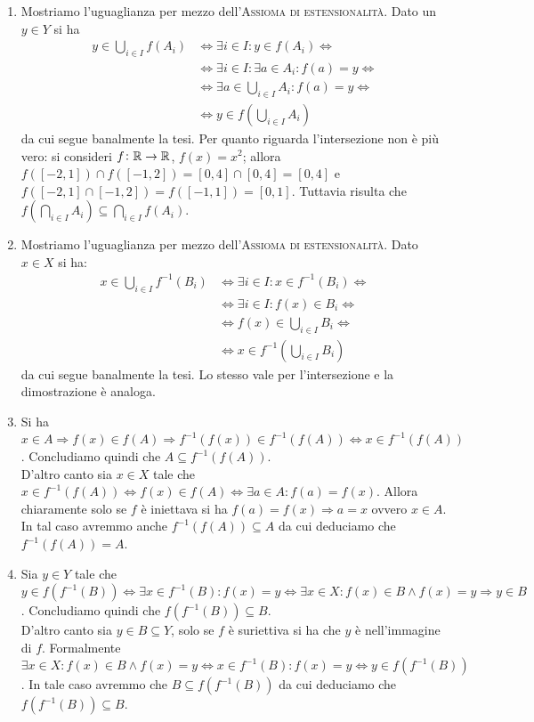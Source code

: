 \documentclass[a4paper]{article}\par \usepackage{style}\par
\begin{document}
\begin{enumerate}
\item Mostriamo l'uguaglianza per mezzo dell'\textsc{Assioma di estensionalità}. Dato un $ y \in Y $ si ha
  \begin{align*}
    y \in \bigcup_{i \in I} f(A_i) & \iff \exists i \in I : y \in f(A_i) \iff \\
                                   & \iff \exists i \in I : \exists a \in A_i : f(a) = y \iff \\
                                   & \iff \exists a \in \bigcup_{i \in I} A_i : f(a) = y \iff \\
                                   & \iff y \in f \left (\bigcup_{i \in I} A_i \right )
  \end{align*}
  da cui segue banalmente la tesi. Per quanto riguarda l'intersezione non è più vero: si consideri $ f \colon \mathbb{R} \to \mathbb{R} $, $ f(x) = x^2 $; allora $ f([-2, 1]) \cap f([-1, 2]) = [0, 4] \cap [0, 4] = [0, 4] $ e $ f([-2, 1] \cap [-1, 2]) = f([-1, 1]) = [0, 1] $. Tuttavia risulta che $ f \left (\bigcap_{i \in I} A_i \right ) \subseteq \bigcap_{i \in I} f(A_i) $.
\item Mostriamo l'uguaglianza per mezzo dell'\textsc{Assioma di estensionalità}. Dato $ x \in X $ si ha:
  \begin{align*}
    x \in \bigcup_{i \in I} f^{-1}(B_i) & \iff \exists i \in I : x \in f^{-1}(B_i) \iff \\
                                        & \iff \exists i \in I : f(x) \in B_i \iff \\
                                        & \iff f(x) \in \bigcup_{i \in I} B_i \iff \\
                                        & \iff x \in f^{-1} \left (\bigcup_{i \in I} B_i \right )
  \end{align*}
  da cui segue banalmente la tesi. Lo stesso vale per l'intersezione e la dimostrazione è analoga.
\item Si ha $ x \in A \Rightarrow f(x) \in f(A) \Rightarrow f^{-1}(f(x)) \in f^{-1}(f(A)) \iff x \in f^{-1}(f(A)) $. Concludiamo quindi che $ A \subseteq f^{-1}(f(A)) $. \\
  D'altro canto sia $ x \in X $ tale che $ x \in f^{-1}(f(A)) \iff f(x) \in f(A) \iff \exists a \in A : f(a) = f(x) $. Allora chiaramente solo se $ f $ è iniettava si ha $ f(a) = f(x) \Rightarrow a = x $ ovvero $ x \in A $. In tal caso avremmo anche $ f^{-1}(f(A)) \subseteq A $ da cui deduciamo che $ f^{-1}(f(A)) = A $.
\item Sia $ y \in Y $ tale che $ y \in f(f^{-1}(B)) \iff \exists x \in f^{-1}(B) : f(x) = y \iff \exists x \in X : f(x) \in B \wedge f(x) = y \Rightarrow y \in B $. Concludiamo quindi che $ f(f^{-1}(B)) \subseteq B $. \\
  D'altro canto sia $ y \in B \subseteq Y $, solo se $ f $ è suriettiva si ha che $ y $ è nell'immagine di $ f $. Formalmente $ \exists x \in X : f(x) \in B \wedge f(x) = y \iff x \in f^{-1}(B) : f(x) = y \iff y \in f(f^{-1}(B)) $. In tale caso avremmo che $ B \subseteq f(f^{-1}(B)) $ da cui deduciamo che $ f(f^{-1}(B)) \subseteq B $.
\end{enumerate}\par 
\end{document}
